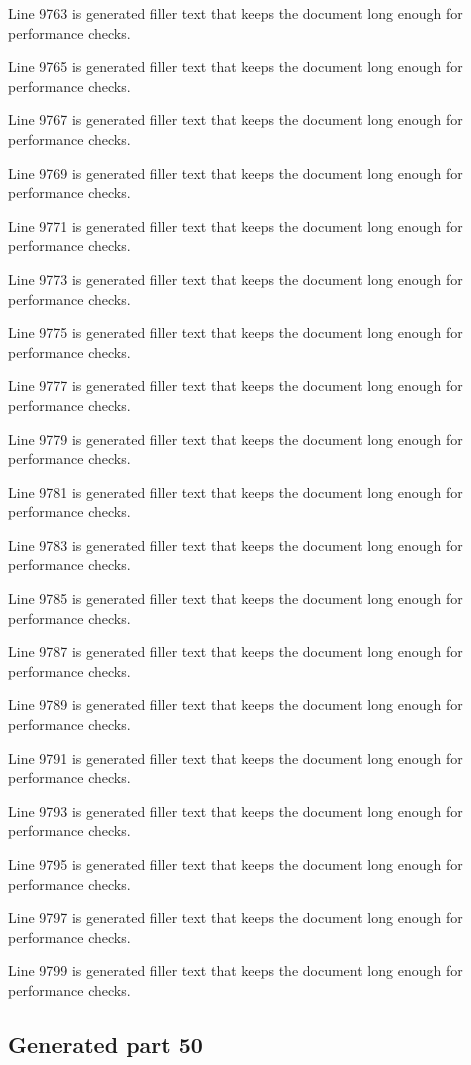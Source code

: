 Line 9763 is generated filler text that keeps the document long enough for performance checks.

Line 9765 is generated filler text that keeps the document long enough for performance checks.

Line 9767 is generated filler text that keeps the document long enough for performance checks.

Line 9769 is generated filler text that keeps the document long enough for performance checks.

Line 9771 is generated filler text that keeps the document long enough for performance checks.

Line 9773 is generated filler text that keeps the document long enough for performance checks.

Line 9775 is generated filler text that keeps the document long enough for performance checks.

Line 9777 is generated filler text that keeps the document long enough for performance checks.

Line 9779 is generated filler text that keeps the document long enough for performance checks.

Line 9781 is generated filler text that keeps the document long enough for performance checks.

Line 9783 is generated filler text that keeps the document long enough for performance checks.

Line 9785 is generated filler text that keeps the document long enough for performance checks.

Line 9787 is generated filler text that keeps the document long enough for performance checks.

Line 9789 is generated filler text that keeps the document long enough for performance checks.

Line 9791 is generated filler text that keeps the document long enough for performance checks.

Line 9793 is generated filler text that keeps the document long enough for performance checks.

Line 9795 is generated filler text that keeps the document long enough for performance checks.

Line 9797 is generated filler text that keeps the document long enough for performance checks.

Line 9799 is generated filler text that keeps the document long enough for performance checks.

\subsection{Generated part 50}

